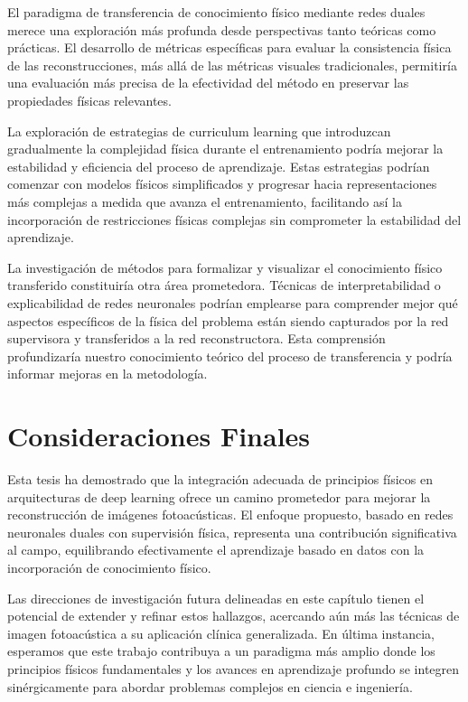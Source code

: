 El paradigma de transferencia de conocimiento físico mediante redes duales merece una exploración más profunda desde perspectivas tanto teóricas como prácticas. El desarrollo de métricas específicas para evaluar la consistencia física de las reconstrucciones, más allá de las métricas visuales tradicionales, permitiría una evaluación más precisa de la efectividad del método en preservar las propiedades físicas relevantes.

La exploración de estrategias de curriculum learning que introduzcan gradualmente la complejidad física durante el entrenamiento podría mejorar la estabilidad y eficiencia del proceso de aprendizaje. Estas estrategias podrían comenzar con modelos físicos simplificados y progresar hacia representaciones más complejas a medida que avanza el entrenamiento, facilitando así la incorporación de restricciones físicas complejas sin comprometer la estabilidad del aprendizaje.

La investigación de métodos para formalizar y visualizar el conocimiento físico transferido constituiría otra área prometedora. Técnicas de interpretabilidad o explicabilidad de redes neuronales podrían emplearse para comprender mejor qué aspectos específicos de la física del problema están siendo capturados por la red supervisora y transferidos a la red reconstructora. Esta comprensión profundizaría nuestro conocimiento teórico del proceso de transferencia y podría informar mejoras en la metodología.

\section{Consideraciones Finales}

Esta tesis ha demostrado que la integración adecuada de principios físicos en arquitecturas de deep learning ofrece un camino prometedor para mejorar la reconstrucción de imágenes fotoacústicas. El enfoque propuesto, basado en redes neuronales duales con supervisión física, representa una contribución significativa al campo, equilibrando efectivamente el aprendizaje basado en datos con la incorporación de conocimiento físico.

Las direcciones de investigación futura delineadas en este capítulo tienen el potencial de extender y refinar estos hallazgos, acercando aún más las técnicas de imagen fotoacústica a su aplicación clínica generalizada. En última instancia, esperamos que este trabajo contribuya a un paradigma más amplio donde los principios físicos fundamentales y los avances en aprendizaje profundo se integren sinérgicamente para abordar problemas complejos en ciencia e ingeniería.
